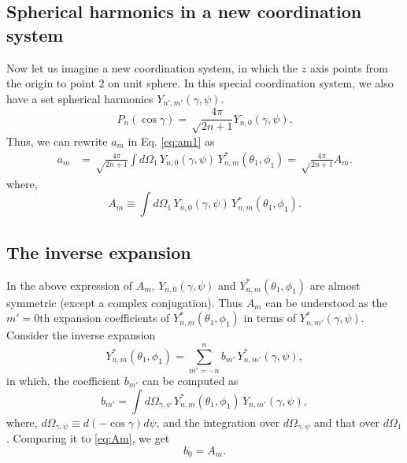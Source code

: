 \documentclass[11pt]{article}
\begin{document}
\subsection{Spherical harmonics in a new coordination system}



Now let us imagine a new coordination system,
in which the $z$ axis points from the origin to point 2 on unit sphere.
%
In this special coordination system,
we also have a set spherical harmonics $Y_{n', m'}(\gamma, \psi)$.
\[
  P_n(\cos\gamma)
=
\sqrt \frac { 4 \pi } { 2 n + 1 }
  Y_{n, 0}(\gamma, \psi).
\]
Thus, we can rewrite $a_m$ in Eq. \eqref{eq:am1} as
\begin{align}
a_m
&=
\sqrt \frac{4 \pi}{ 2 n + 1 }
\int d\Omega_1 \, Y_{n, 0}(\gamma, \psi) \, Y^*_{n,m}(\theta_1, \phi_1)
=
\sqrt \frac{4 \pi}{ 2 n + 1 } A_m.
\label{eq:am2}
\end{align}
%
where,
\begin{equation}
A_m
\equiv
\int d\Omega_1 \, Y_{n, 0}(\gamma, \psi) \, Y^*_{n,m}(\theta_1, \phi_1).
\label{eq:Am}
\end{equation}



\subsection{The inverse expansion}



In the above expression of $A_m$,
$Y_{n, 0}(\gamma, \psi)$ and $Y_{n, m}^*(\theta_1, \phi_1)$
are almost symmetric (except a complex conjugation).
%
Thus $A_m$
can be understood as the $m'=0$th expansion coefficients
of $Y_{n, m}^*(\theta_1, \phi_1)$
in terms of $Y_{n, m'}^*(\gamma, \psi)$.
%
Consider the inverse expansion
\begin{equation}
  Y_{n, m}^*(\theta_1, \phi_1)
=
  \sum_{m' = -n}^n b_{m'} \,Y_{n, m'}^*(\gamma, \psi),
  \label{eq:expansion2}
\end{equation}
in which,
the coefficient $b_{m'}$ can be computed as
\begin{equation}
  b_{m'}
=
  \int d \Omega_{\gamma,\psi} \,
  Y_{n, m}^*(\theta_1, \phi_1) \,
  Y_{n, m'}(\gamma, \psi),
  \label{eq:bm}
\end{equation}
where, $d\Omega_{\gamma, \psi} \equiv d(-\cos\gamma) d\psi$,
and the integration over $d\Omega_{\gamma, \psi}$
and that over $d\Omega_1$.
Comparing it to \eqref{eq:Am}, we get
\begin{equation}
  b_0 = A_m.
  \label{eq:b0Am}
\end{equation}
\end{document}
